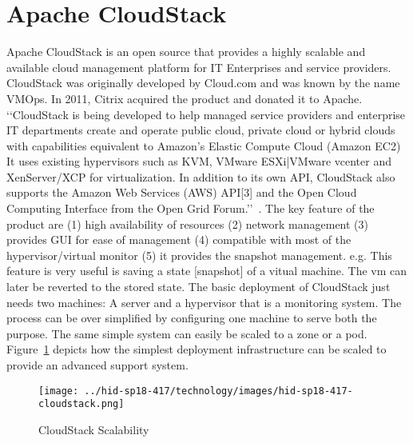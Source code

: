 
\section{Apache CloudStack}
Apache CloudStack is an open source that provides a highly scalable
and available cloud management platform for IT Enterprises and service
providers. CloudStack was originally developed by Cloud.com and was
known by the name VMOps.  In 2011, Citrix acquired the product and
donated it to Apache.
‘‘CloudStack is being developed to help managed service providers and
enterprise IT departments create and operate public cloud, private
cloud or hybrid clouds with capabilities equivalent to Amazon's
Elastic Compute Cloud (Amazon EC2) It uses existing hypervisors such
as KVM, VMware ESXi|VMware vcenter and XenServer/XCP for
virtualization. In addition to its own API, CloudStack also supports
the Amazon Web Services (AWS) API[3] and the Open Cloud Computing
Interface from the Open Grid Forum.’’~\cite{hid-sp18-417-wiki-cloudStack}.
The key feature of the product are 
 (1) high availability of resources
 (2) network management
 (3) provides GUI for ease of management
 (4) compatible with most of the hypervisor/virtual monitor
 (5) it provides the snapshot management. e.g. This feature is 
very useful is saving a state [snapshot] of a vitual machine. 
The vm can later be reverted to the stored state.  
The basic deployment of CloudStack just needs two machines: 
 A server and a hypervisor that is a monitoring system.  The process
can be over simplified by configuring one machine to serve both the
purpose.
The same simple system can easily be scaled to a zone or a pod.
Figure~\ref{F:cloudstack-scalabuility} depicts how the simplest
deployment infrastructure can be scaled to provide an advanced support
system.
\begin{figure}[htb]
\texttt{[image: ../hid-sp18-417/technology/images/hid-sp18-417-cloudstack.png]}
\caption{CloudStack Scalability~\cite{hid-sp18-417-cloudstack-scaling}}
\label{F:cloudstack-scalabuility}
\end{figure}
